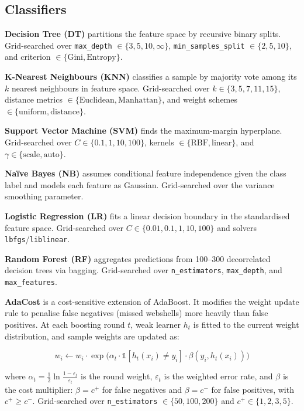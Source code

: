 \documentclass[journal,twocolumn]{IEEEtran}
\begin{document}
\subsection{Classifiers}

\textbf{Decision Tree (DT)} partitions the feature space by recursive binary splits. Grid-searched over \texttt{max\_depth} $\in \{3, 5, 10, \infty\}$, \texttt{min\_samples\_split} $\in \{2, 5, 10\}$, and criterion $\in \{\text{Gini}, \text{Entropy}\}$.

\textbf{K-Nearest Neighbours (KNN)} classifies a sample by majority vote among its $k$ nearest neighbours in feature space. Grid-searched over $k \in \{3, 5, 7, 11, 15\}$, distance metrics $\in \{\text{Euclidean}, \text{Manhattan}\}$, and weight schemes $\in \{\text{uniform}, \text{distance}\}$.

\textbf{Support Vector Machine (SVM)} finds the maximum-margin hyperplane. Grid-searched over $C \in \{0.1, 1, 10, 100\}$, kernels $\in \{\text{RBF}, \text{linear}\}$, and $\gamma \in \{\text{scale}, \text{auto}\}$.

\textbf{Na\"{i}ve Bayes (NB)} assumes conditional feature independence given the class label and models each feature as Gaussian. Grid-searched over the variance smoothing parameter.

\textbf{Logistic Regression (LR)} fits a linear decision boundary in the standardised feature space. Grid-searched over $C \in \{0.01, 0.1, 1, 10, 100\}$ and solvers \texttt{lbfgs}/\texttt{liblinear}.

\textbf{Random Forest (RF)} aggregates predictions from 100--300 decorrelated decision trees via bagging. Grid-searched over \texttt{n\_estimators}, \texttt{max\_depth}, and \texttt{max\_features}.

\textbf{AdaCost} \cite{fan1999adacost} is a cost-sensitive extension of AdaBoost. It modifies the weight update rule to penalise false negatives (missed webshells) more heavily than false positives. At each boosting round $t$, weak learner $h_t$ is fitted to the current weight distribution, and sample weights are updated as:

\begin{equation}
  w_i \leftarrow w_i \cdot \exp\!\bigl(\alpha_t \cdot \mathbb{1}[h_t(x_i) \neq y_i] \cdot \beta(y_i, h_t(x_i))\bigr)
  \label{eq:adacost}
\end{equation}

where $\alpha_t = \frac{1}{2}\ln\!\frac{1-\varepsilon_t}{\varepsilon_t}$ is the round weight, $\varepsilon_t$ is the weighted error rate, and $\beta$ is the cost multiplier: $\beta = c^+$ for false negatives and $\beta = c^-$ for false positives, with $c^+ \geq c^-$. Grid-searched over \texttt{n\_estimators} $\in \{50, 100, 200\}$ and $c^+ \in \{1, 2, 3, 5\}$.
\end{document}
